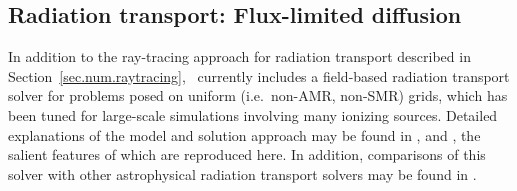 \subsection{Radiation transport: Flux-limited diffusion}
\label{sec.num.rad-fld}


In addition to the ray-tracing approach for radiation transport
described in Section~\ref{sec.num.raytracing}, \enzo\ currently includes
a field-based radiation transport solver for problems posed on uniform
(i.e.~non-AMR, non-SMR) grids, which has been tuned for large-scale simulations
involving many ionizing sources.  Detailed explanations of the model and
solution approach may be found in
\cite{NBHBROW2007}, \cite{ReynoldsHayesPaschosNorman2009} and
\cite{NRS2009}, the salient features of which are reproduced here. 
In addition, comparisons of this solver with other astrophysical
radiation transport solvers may be found in \cite{IlievEtAl2009}.  

